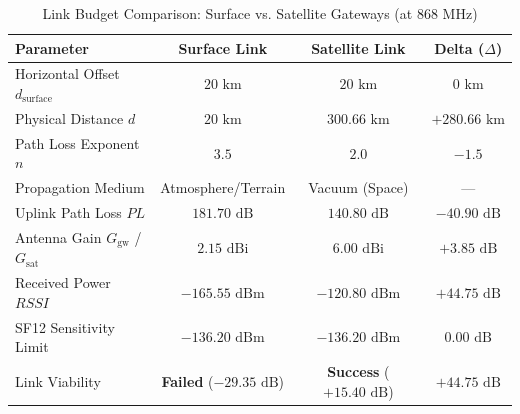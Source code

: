 \documentclass{ijuc}
\begin{document}
\begin{table}
\centering
\caption{Link Budget Comparison: Surface vs. Satellite Gateways (at $868$ MHz)}
\label{tab:link_budget_comparison}
\begin{tabular}{lccc}
\toprule
\textbf{Parameter} & \textbf{Surface Link} & \textbf{Satellite Link} & \textbf{Delta ($\Delta$)} \\
\midrule
Horizontal Offset $d_{\text{surface}}$ & $20\text{ km}$ & $20\text{ km}$ & $0\text{ km}$ \\
Physical Distance $d$ & $20\text{ km}$ & $300.66\text{ km}$ & $+280.66\text{ km}$ \\
Path Loss Exponent $n$ & $3.5$ & $2.0$ & $-1.5$ \\
Propagation Medium & Atmosphere/Terrain & Vacuum (Space) & — \\
Uplink Path Loss $PL$ & $181.70\text{ dB}$ & $140.80\text{ dB}$ & $-40.90\text{ dB}$ \\
Antenna Gain $G_{\text{gw}}$ / $G_{\text{sat}}$ & $2.15\text{ dBi}$ & $6.00\text{ dBi}$ & $+3.85\text{ dB}$ \\
Received Power $RSSI$ & $-165.55\text{ dBm}$ & $-120.80\text{ dBm}$ & $+44.75\text{ dB}$ \\
SF12 Sensitivity Limit & $-136.20\text{ dBm}$ & $-136.20\text{ dBm}$ & $0.00\text{ dB}$ \\
Link Viability & \textbf{Failed} ($-29.35\text{ dB}$) & \textbf{Success} ($+15.40\text{ dB}$) & $+44.75\text{ dB}$ \\
\bottomrule
\end{tabular}
\end{table}
\end{document}
